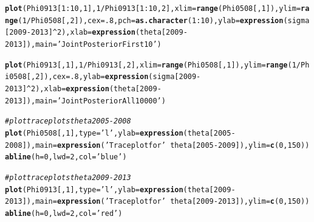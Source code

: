 \documentclass{article}\usepackage[]{graphicx}\usepackage[]{color}
\makeatletter
\newcommand{\hlnum}[1]{\textcolor[rgb]{0.686,0.059,0.569}{#1}}%
\newcommand{\hlstr}[1]{\textcolor[rgb]{0.192,0.494,0.8}{#1}}%
\newcommand{\hlcom}[1]{\textcolor[rgb]{0.678,0.584,0.686}{\textit{#1}}}%
\newcommand{\hlopt}[1]{\textcolor[rgb]{0,0,0}{#1}}%
\newcommand{\hlstd}[1]{\textcolor[rgb]{0.345,0.345,0.345}{#1}}%
\newcommand{\hlkwc}[1]{\textcolor[rgb]{0.333,0.667,0.333}{#1}}%
\newcommand{\hlkwd}[1]{\textcolor[rgb]{0.737,0.353,0.396}{\textbf{#1}}}%
\newenvironment{kframe}{%
 \def\at@end@of@kframe{}%
 \ifinner\ifhmode%
  \def\at@end@of@kframe{\end{minipage}}%
  \begin{minipage}{\columnwidth}%
 \fi\fi%
 \def\FrameCommand##1{\hskip\@totalleftmargin \hskip-\fboxsep
 \colorbox{shadecolor}{##1}\hskip-\fboxsep
     \hskip-\linewidth \hskip-\@totalleftmargin \hskip\columnwidth}%
 \MakeFramed {\advance\hsize-\width
   \@totalleftmargin\z@ \linewidth\hsize
   \@setminipage}}%
 {\par\unskip\endMakeFramed%
 \at@end@of@kframe}
\newenvironment{knitrout}{}{} %
\makeatother
\begin{document}
{\begin{enumerate}
\begin{enumerate}
\begin{knitrout}
\begin{kframe}
\begin{alltt}
\hlkwd{plot}\hlstd{(Phi0913[}\hlnum{1}\hlopt{:}\hlnum{10}\hlstd{,}\hlnum{1}\hlstd{],}\hlnum{1}\hlopt{/}\hlstd{Phi0913[}\hlnum{1}\hlopt{:}\hlnum{10}\hlstd{,}\hlnum{2}\hlstd{],}\hlkwc{xlim}\hlstd{=}\hlkwd{range}\hlstd{(Phi0508[,}\hlnum{1}\hlstd{]),}\hlkwc{ylim}\hlstd{=}\hlkwd{range}\hlstd{(}\hlnum{1}\hlopt{/}\hlstd{Phi0508[,}\hlnum{2}\hlstd{]),}\hlkwc{cex}\hlstd{=}\hlnum{.8}\hlstd{,}\hlkwc{pch}\hlstd{=}\hlkwd{as.character}\hlstd{(}\hlnum{1}\hlopt{:}\hlnum{10}\hlstd{),} \hlkwc{ylab}\hlstd{=}\hlkwd{expression}\hlstd{(sigma [}\hlnum{2009}\hlopt{-}\hlnum{2013}\hlstd{]}\hlopt{^}\hlnum{2}\hlstd{),} \hlkwc{xlab} \hlstd{=} \hlkwd{expression}\hlstd{(theta [}\hlnum{2009}\hlopt{-}\hlnum{2013}\hlstd{]),} \hlkwc{main}\hlstd{=}\hlstr{'Joint Posterior First 10'}\hlstd{)}

\hlkwd{plot}\hlstd{(Phi0913[,}\hlnum{1}\hlstd{],}\hlnum{1}\hlopt{/}\hlstd{Phi0913[,}\hlnum{2}\hlstd{],}\hlkwc{xlim}\hlstd{=}\hlkwd{range}\hlstd{(Phi0508[,}\hlnum{1}\hlstd{]),}\hlkwc{ylim}\hlstd{=}\hlkwd{range}\hlstd{(}\hlnum{1}\hlopt{/}\hlstd{Phi0508[,}\hlnum{2}\hlstd{]),}\hlkwc{cex}\hlstd{=}\hlnum{.8}\hlstd{,} \hlkwc{ylab}\hlstd{=}\hlkwd{expression}\hlstd{(sigma [}\hlnum{2009}\hlopt{-}\hlnum{2013}\hlstd{]}\hlopt{^}\hlnum{2}\hlstd{),} \hlkwc{xlab} \hlstd{=} \hlkwd{expression}\hlstd{(theta [}\hlnum{2009}\hlopt{-}\hlnum{2013}\hlstd{]),} \hlkwc{main}\hlstd{=}\hlstr{'Joint Posterior All 10000'}\hlstd{)}


\hlcom{# plot trace plots theta 2005-2008}
\hlkwd{plot}\hlstd{(Phi0508[,}\hlnum{1}\hlstd{],}\hlkwc{type}\hlstd{=}\hlstr{'l'}\hlstd{,}\hlkwc{ylab}\hlstd{=}\hlkwd{expression}\hlstd{(theta [}\hlnum{2005}\hlopt{-}\hlnum{2008}\hlstd{]),} \hlkwc{main}\hlstd{=}\hlkwd{expression}\hlstd{(}\hlstr{'Trace plot for '} \hlopt{~} \hlstd{theta [}\hlnum{2005}\hlopt{-}\hlnum{2009}\hlstd{]),} \hlkwc{ylim} \hlstd{=} \hlkwd{c}\hlstd{(}\hlnum{0}\hlstd{,}\hlnum{150}\hlstd{))}
\hlkwd{abline}\hlstd{(}\hlkwc{h}\hlstd{=}\hlnum{0}\hlstd{,}\hlkwc{lwd}\hlstd{=}\hlnum{2}\hlstd{,}\hlkwc{col}\hlstd{=}\hlstr{'blue'}\hlstd{)}

\hlcom{# plot trace plots theta 2009-2013}
\hlkwd{plot}\hlstd{(Phi0913[,}\hlnum{1}\hlstd{],}\hlkwc{type}\hlstd{=}\hlstr{'l'}\hlstd{,}\hlkwc{ylab}\hlstd{=}\hlkwd{expression}\hlstd{(theta [}\hlnum{2009}\hlopt{-}\hlnum{2013}\hlstd{]),} \hlkwc{main}\hlstd{=}\hlkwd{expression}\hlstd{(}\hlstr{'Trace plot for '} \hlopt{~} \hlstd{theta [}\hlnum{2009}\hlopt{-}\hlnum{2013}\hlstd{]),} \hlkwc{ylim} \hlstd{=} \hlkwd{c}\hlstd{(}\hlnum{0}\hlstd{,}\hlnum{150}\hlstd{))}
\hlkwd{abline}\hlstd{(}\hlkwc{h}\hlstd{=}\hlnum{0}\hlstd{,}\hlkwc{lwd}\hlstd{=}\hlnum{2}\hlstd{,}\hlkwc{col}\hlstd{=}\hlstr{'red'}\hlstd{)}


\end{alltt}
\end{kframe}
\end{knitrout}
\end{enumerate}
\end{enumerate}}
\end{document}
